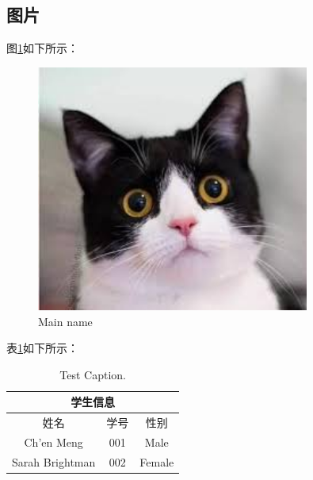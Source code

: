 \documentclass[a4paper, 12pt, centering]{article}
\begin{document}
\subsection{图片}
图\ref{Fig.main}如下所示：
\begin{figure}[H] %
\centering %
\includegraphics[width=0.8\textwidth]{example1.jpeg} %
\caption{Main name} %
\label{Fig.main} %
\end{figure}

表\ref{tab.main}如下所示：
\begin{table}[H]
\centering
\caption{Test Caption.}
\begin{tabular}{|c|c|c|}
\hline
\multicolumn{3}{|c|}{学生信息}\\
\hline
姓名& 学号& 性别\\
\hline
Ch'en Meng& 001& Male\\
Sarah Brightman& 002& Female\\
\hline
\end{tabular}
\label{tab.main}
\end{table}
\end{document}
